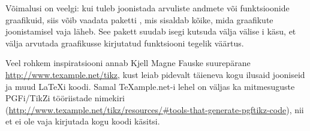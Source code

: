 \begin{center}
\end{center}

Võimalusi on veelgi: kui tuleb joonistada arvuliste andmete või
funktsioonide graafikuid, siis võib vaadata paketti , mis
sisaldab kõike, mida graafikute joonistamisel vaja läheb. See pakett
suudab isegi kutsuda välja välise i käsu, et välja arvutada
graafikusse kirjutatud funktsiooni tegelik väärtus.

Veel rohkem inspiratsiooni annab Kjell Magne
Fauske suurepärane \url{http://www.texample.net/tikz}, kust leiab
pidevalt täieneva kogu ilusaid jooniseid ja muud \LaTeX i koodi. Samal
\TeX{}ample.net-i lehel on väljas ka
mitmesuguste PGFi/TikZi tööriistade nimekiri
(\url{http://www.texample.net/tikz/resources/#tools-that-generate-pgftikz-code}),
nii et ei ole vaja kirjutada kogu koodi käsitsi.

